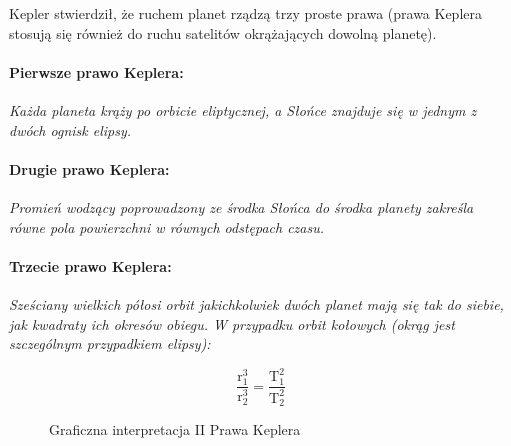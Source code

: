 \documentclass{article}
\begin{document}
Kepler stwierdził, że ruchem planet rządzą trzy proste prawa (prawa Keplera stosują się również do ruchu satelitów okrążających dowolną planetę).

\paragraph{Pierwsze prawo Keplera:}

\begin{center}
\textsl{Każda planeta krąży po orbicie eliptycznej, a Słońce znajduje się w jednym z dwóch ognisk elipsy.}
\end{center}

\paragraph{Drugie prawo Keplera:}

\begin{center}
\textsl{Promień wodzący poprowadzony ze środka Słońca do środka planety zakreśla równe pola powierzchni w równych odstępach czasu.}
\end{center}
\noindent
{}

\paragraph{Trzecie prawo Keplera:}

\begin{center}
\textsl{Sześciany wielkich półosi orbit jakichkolwiek dwóch planet mają się tak do siebie, jak kwadraty ich okresów obiegu. W przypadku orbit kołowych (okrąg jest szczególnym przypadkiem elipsy):}

\begin{equation}
  \frac{\mathrm{r}_{1}^{3}}{\mathrm{r}_{2}^{3}} = \frac{\mathrm{T}_{1}^{2}}{\mathrm{T}_{2}^{2}}
\end{equation}
\end{center}
\pagebreak

\begin{figure}[h]
\centering
\caption[2 prawo Keplera obrazek]{\label{rys:kepler2}
    Graficzna interpretacja II Prawa Keplera
} \vspace{2ex}
\end{figure}
\end{document}

